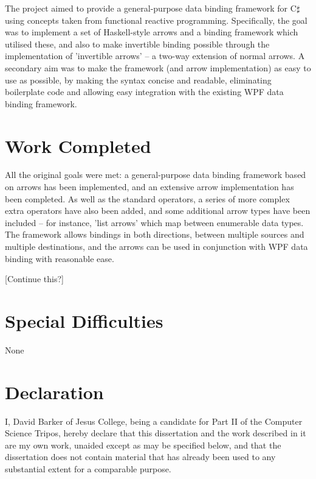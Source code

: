\documentclass[12pt,twoside,notitlepage]{report}
\begin{document}
The project aimed to provide a general-purpose data binding framework for C$\sharp$ using concepts taken from functional reactive programming. Specifically, the goal was to implement a set of Haskell-style arrows and a binding framework which utilised these, and also to make invertible binding possible through the implementation of 'invertible arrows' -- a two-way extension of normal arrows. A secondary aim was to make the framework (and arrow implementation) as easy to use as possible, by making the syntax concise and readable, eliminating boilerplate code and allowing easy integration with the existing WPF data binding framework.

\section*{Work Completed}

All the original goals were met: a general-purpose data binding framework based on arrows has been implemented, and an extensive arrow implementation has been completed. As well as the standard operators, a series of more complex extra operators have also been added, and some additional arrow types have been included -- for instance, 'list arrows' which map between enumerable data types. The framework allows bindings in both directions, between multiple sources and multiple destinations, and the arrows can be used in conjunction with WPF data binding with reasonable ease.

[Continue this?]

\section*{Special Difficulties}

None
 
\newpage
\section*{Declaration}

I, David Barker of Jesus College, being a candidate for Part II of
the Computer Science Tripos, hereby declare that this dissertation
and the work described in it are my own work, unaided except as may
be specified below, and that the dissertation does not contain
material that has already been used to any substantial extent for a
comparable purpose.

\bigskip
{}

\medskip
{}
\end{document}
